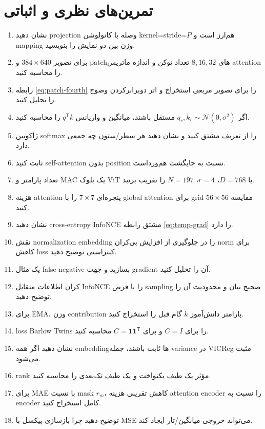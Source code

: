 \documentclass[12pt,openany,oneside]{book}
\newcommand{\trans}{^{\mathsf T}}
\begin{document}
\section{تمرین‌های نظری و اثباتی}
\begin{enumerate}[label=\arabic*.]
\item نشان دهید projection وصله با کانولوشن kernel=stride=$P$ هم‌ارز است و mapping وزن بین دو نمایش را بنویسید.
\item برای تصویر $384\times640$ و patchهای $8,16,32$ تعداد توکن و اندازه ماتریس attention را محاسبه کنید.
\item رابطه \eqref{eq:patch-fourth} را برای تصویر مربعی استخراج و اثر دوبرابرکردن وضوح را تحلیل کنید.
\item اگر $q_r,k_r\sim\mathcal N(0,\sigma^2)$ مستقل باشند، میانگین و واریانس $q\trans k$ را محاسبه کنید.
\item ژاکوبین softmax را از تعریف مشتق کنید و نشان دهید هر سطر/ستون چه جمعی دارد.
\item ثابت کنید self-attention بدون position نسبت به جایگشت هم‌ورداست.
\item تعداد پارامتر و MAC یک بلوک ViT با $D=768$، $r=4$، $N=197$ را تقریب بزنید.
\item هزینه attention پنجره‌ای $7\times7$ را با global attention برای grid $56\times56$ مقایسه کنید.
\item نشان دهید cross-entropy InfoNCE مشتق رابطه \eqref{eq:temp-grad} را دارد.
\item نقش normalization embedding را در جلوگیری از افزایش بی‌کران norm برای کاهش loss کنتراستی توضیح دهید.
\item یک مثال false negative بسازید و جهت gradient آن را تحلیل کنید.
\item کران اطلاعات متقابل InfoNCE را با فرض sampling صحیح بیان و محدودیت آن را توضیح دهید.
\item برای EMA، وزن contribution پارامتر دانش‌آموز $k$ گام قبل را استخراج کنید.
\item loss Barlow Twins را برای $C=I$ و برای $C=\mathbf{1}\mathbf{1}\trans$ محاسبه کنید.
\item نشان دهید اگر همه embeddingها ثابت باشند، جمله variance در VICReg مثبت می‌شود.
\item rank مؤثر یک طیف یکنواخت و یک طیف تک‌بعدی را محاسبه کنید.
\item برای MAE با نسبت mask $r_m$، کاهش تقریبی هزینه attention encoder را نسبت به encoder کامل استخراج کنید.
\item توضیح دهید چرا بازسازی پیکسل با MSE می‌تواند خروجی میانگین/تار ایجاد کند.

\end{enumerate}
\end{document}
